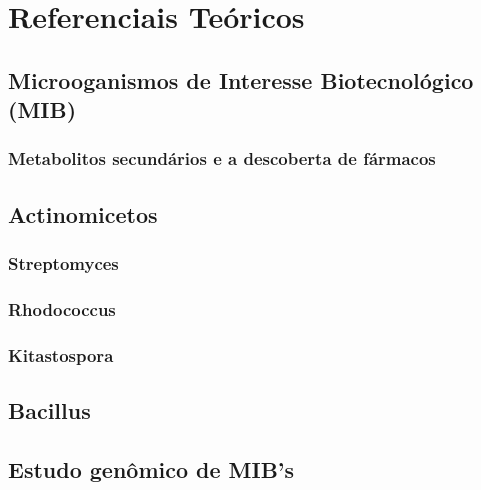 \chapter{Referenciais Teóricos}
\label{cap:referenciais_teoricos}

\section{Microoganismos de Interesse Biotecnológico (MIB)}
\subsection{Metabolitos secundários e a descoberta de fármacos}

\section{Actinomicetos}
\subsection{Streptomyces}%
\subsection{Rhodococcus}
\subsection{Kitastospora}
\section{Bacillus}

\section{Estudo genômico de MIB's}

